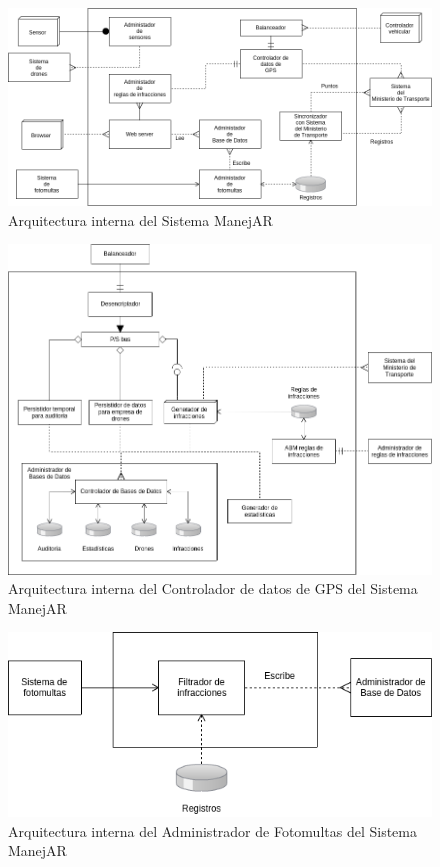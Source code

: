 \begin{figure}
\centerline{\includegraphics[width=1\textwidth]{./imagenes/arquitectura_tp2/manejar.png}}
\caption{Arquitectura interna del Sistema ManejAR}
\end{figure}


\begin{figure}
\centerline{\includegraphics[width=1\textwidth]{./imagenes/arquitectura_tp2/controlador_datos_gps.png}}
\caption{Arquitectura interna del Controlador de datos de GPS del Sistema ManejAR}
\end{figure}


\begin{figure}
\centerline{\includegraphics[width=1\textwidth]{./imagenes/arquitectura_tp2/administrador_fotomultas.png}}
\caption{Arquitectura interna del Administrador de Fotomultas del Sistema ManejAR}
\end{figure}


